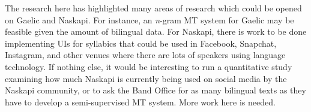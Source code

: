 The research here has highlighted many areas of research which could be opened on Gaelic and Naskapi. For instance, an \textit{n}-gram MT system for Gaelic may be feasible given the amount of bilingual data. For Naskapi, there is work to be done implementing UIs for syllabics that could be used in Facebook, Snapchat, Instagram, and other venues where there are lots of speakers using language technology. If nothing else, it would be interesting to run a quantitative study examining how much Naskapi is currently being used on social media by the Naskapi community, or to ask the Band Office for as many bilingual texts as they have to develop a semi-supervised MT system. More work here is needed.

%
%
%
%





%
%
%
%
%
